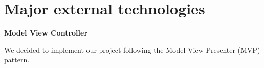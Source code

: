 \section{Major external technologies}

\textbf{Model View Controller} 

We decided to implement our project following the Model View Presenter (MVP) pattern. 












